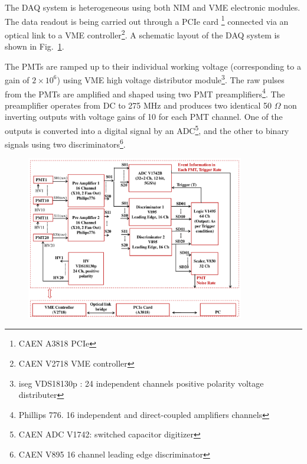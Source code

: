 

The DAQ system is heterogeneous using both 
NIM and VME electronic modules. The data readout is being carried out through a PCIe card \footnote{CAEN A3818 PCIe}  connected via an optical link to a VME controller\footnote{CAEN V2718 VME controller}. A schematic layout of the DAQ system is shown in Fig.~{\ref{Fig:DAQscheme}}. 

The PMTs are ramped up to their individual working voltage (corresponding to a gain of $2\times10^6$) using VME high voltage distributor module\footnote{iseg VDS18130p : 
24 independent channels positive polarity voltage distributer}. The raw pulses from the PMTs are amplified and shaped using 
two PMT preamplifiers\footnote{Phillips 776. 16 independent and direct-coupled amplifiers channels}. The preamplifier operates 
from DC to 275 MHz and produces two identical 50 $\Omega$ non inverting outputs with voltage gains of 10 for each PMT channel. One 
of the outputs is converted into a digital signal by an ADC\footnote{CAEN ADC V1742: switched capacitor digitizer}, and the other to 
binary signals using two discriminators\footnote{CAEN V895 16 channel leading edge discriminator}.

\begin{figure}[h]
   \centering
   \includegraphics[width=0.85\textwidth]{fig/DAQscheme.pdf}
   \label{Fig:DAQscheme}
\end{figure}


